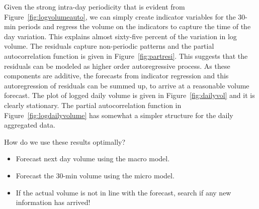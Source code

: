 Given the strong intra-day periodicity that is evident from Figure~\ref{fig:logvolumeauto}, we can simply create indicator variables for the 30-min periods and regress the volume on the indicators to capture the time of the day variation. This explains almost sixty-five percent of the variation in log volume. The residuals capture non-periodic patterns and the partial autocorrelation function is given in Figure~\ref{fig:partresi}. This suggests that the residuals can be modeled as higher order autoregressive process. As these components are additive, the forecasts from indicator regression and this autoregression of residuals can be summed up, to arrive at a reasonable volume forecast. The plot of logged daily volume is given in Figure~\ref{fig:dailyvol} and it is clearly stationary. The partial autocorrelation function in Figure~\ref{fig:logdailyvolume} has somewhat a simpler structure for the daily aggregated data. 


How do we use these results optimally?
	\begin{itemize}
	\item Forecast next day volume using the macro model.
	\item Forecast the 30-min volume using the micro model.
	\item If the actual volume is not in line with the forecast, search if any new information has arrived!
	\end{itemize}
	
